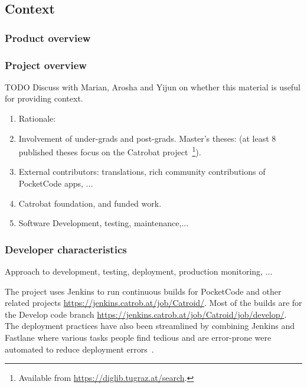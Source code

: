 \subsection{Context}

\subsubsection{Product overview}

\subsubsection{Project overview}

TODO Discuss with Marian, Arosha and Yijun on whether this material is useful for providing context.
\begin{enumerate}
    \item Rationale:
    \item Involvement of under-grads and post-grads. Master's theses: (at least 8 published theses focus on the Catrobat project~\footnote{Available from \url{https://diglib.tugraz.at/search}.}).
    \item External contributors: translations, rich community contributions of PocketCode apps, ...
    \item Catrobat foundation, and funded work.
    \item Software Development, testing, maintenance,...
\end{enumerate}

\subsubsection{Developer characteristics}
Approach to development, testing, deployment, production monitoring, ...

The project uses Jenkins to run continuous builds for PocketCode and other related projects \url{https://jenkins.catrob.at/job/Catroid/}. Most of the builds are for the Develop code branch \url{https://jenkins.catrob.at/job/Catroid/job/develop/}. The deployment practices have also been streamlined by combining Jenkins and Fastlane where various tasks people find tedious and are error-prone were automated to reduce deployment errors~\citep{luhana2018streamlining}.

